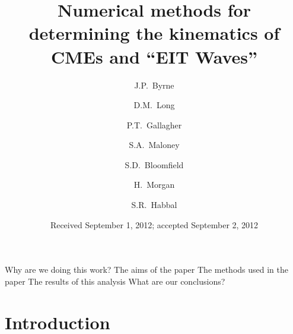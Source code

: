 \documentclass[structabstract]{aa}
\begin{document}
\title{Numerical methods for determining the kinematics of CMEs and ``EIT Waves''}

\author{J.P.~Byrne
	\and D.M.~Long
	\and P.T.~Gallagher
	\and S.A.~Maloney
	\and S.D.~Bloomfield
	\and H.~Morgan
	\and S.R.~Habbal}

\date{Received September 1, 2012; accepted September 2, 2012}
\abstract
{Why are we doing this work?}
{The aims of the paper}
{The methods used in the paper}
{The results of this analysis}
{What are our conclusions?}



\maketitle

%

\section{Introduction}
\label{sect_intro}
\end{document}

